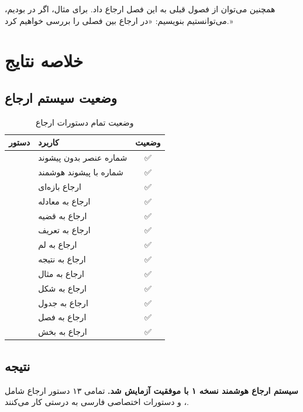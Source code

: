 \documentclass{matinbook}
\begin{document}
همچنین می‌توان از فصول قبلی به این فصل ارجاع داد.
برای مثال، اگر در  بودیم،
می‌توانستیم بنویسیم:
«در  ارجاع بین فصلی
را بررسی خواهیم کرد.»

\chapter{خلاصه نتایج}

\section{وضعیت سیستم ارجاع}

\begin{table}[h]
\centering
\caption{وضعیت تمام دستورات ارجاع}
\label{tab:reference-status}
\begin{tabular}{|c|C{4cm}|c|}
\hline
\textbf{دستور} & \textbf{کاربرد} & \textbf{وضعیت} \\
\hline
{} & شماره عنصر بدون پیشوند & \textcolor{matingreen}{✅} \\
 & شماره با پیشوند هوشمند & \textcolor{matingreen}{✅} \\
 & ارجاع بازه‌ای & \textcolor{matingreen}{✅} \\
 & ارجاع به معادله & \textcolor{matingreen}{✅} \\
 & ارجاع به قضیه & \textcolor{matingreen}{✅} \\
 & ارجاع به تعریف & \textcolor{matingreen}{✅} \\
 & ارجاع به لم & \textcolor{matingreen}{✅} \\
 & ارجاع به نتیجه & \textcolor{matingreen}{✅} \\
 & ارجاع به مثال & \textcolor{matingreen}{✅} \\
 & ارجاع به شکل & \textcolor{matingreen}{✅} \\
 & ارجاع به جدول & \textcolor{matingreen}{✅} \\
 & ارجاع به فصل & \textcolor{matingreen}{✅} \\
 & ارجاع به بخش & \textcolor{matingreen}{✅} \\
\hline
\end{tabular}
\end{table}

\section{نتیجه}

\textbf{سیستم ارجاع هوشمند  نسخه ۱ با موفقیت آزمایش شد.}
تمامی ۱۳ دستور ارجاع شامل ، 
و دستورات اختصاصی فارسی به درستی کار می‌کنند. 🎉
\end{document}
